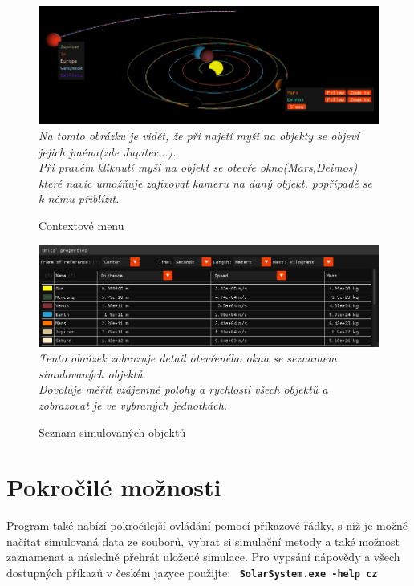 \begin{landscape}
\begin{figure}[ht]
	\caption{Contextové menu }
	\centering
	\includegraphics[width=\linewidth,keepaspectratio]{Figs/ContextMenu}\\
	\textit{Na tomto obrázku je vidět, že při najetí myši na objekty se objeví jejich jména(zde Jupiter...).\\ Při pravém kliknutí myší na objekt se otevře okno(Mars,Deimos) které navíc umožňuje zafixovat kameru na daný objekt, popřípadě se k němu přiblížit.}
\end{figure}

\begin{figure}[ht]
	\caption{Seznam simulovaných objektů}
	\centering
	\includegraphics[width=\linewidth,keepaspectratio]{Figs/UnitsProperties_notEdited}\\
	\textit{Tento obrázek zobrazuje detail otevřeného okna se seznamem simulovaných objektů.\\ Dovoluje měřit vzájemné polohy a rychlosti všech objektů a zobrazovat je ve vybraných jednotkách.}
\end{figure}
\end{landscape}
\FloatBarrier
\section{Pokročilé možnosti}
Program také nabízí pokročilejší ovládání pomocí příkazové řádky, s níž je možné načítat simulovaná data ze souborů, vybrat si simulační metody a také možnost zaznamenat a následně přehrát uložené simulace.
Pro vypsání nápovědy a všech dostupných příkazů v českém jazyce použijte:
\ \texttt{\textbf{SolarSystem.exe -help cz}}

